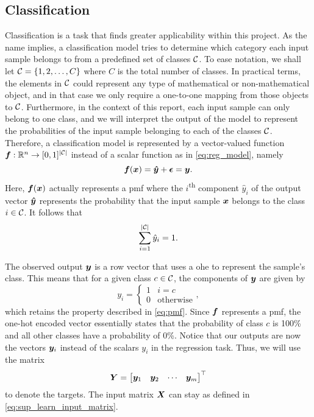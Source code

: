 \documentclass[../main.tex]{subfiles}
\begin{document}
\subsection{Classification}
Classification is a task that finds greater applicability within this project.
As the name implies, a classification model tries to determine which category each input sample belongs to from a predefined set of classes ${\mathcal{C}}$.
To ease notation, we shall let ${\mathcal{C}}=\{1, 2, \dots, C\}$ where $C$ is the total number of classes.
In practical terms, the elements in ${\mathcal{C}}$ could represent any type of mathematical or non-mathematical object, and in that case we only require a one-to-one mapping from those objects to ${\mathcal{C}}$.
Furthermore, in the context of this report, each input sample can only belong to one class, and we will interpret the output of the model to represent the probabilities of the input sample belonging to each of the classes ${\mathcal{C}}$.
Therefore, a classification model is represented by a vector-valued function
${\bm{f}} : \mathbb{R}^n \rightarrow [0,1]^{\lvert{\mathcal{C}}\rvert}$
instead of a scalar function as in \cref{eq:reg_model}, namely
\begin{equation}
    \label{eq:cla_model}
    {\bm{f}}({\bm{x}}) = {\bm{\hat{y}}} + \bm{\epsilon}= {\bm{y}}.
\end{equation}
Here, ${\bm{f}}({\bm{x}})$ actually represents a \gls{pmf} where the $i$\textsuperscript{th} component $\hat{y}_i$ of the output vector ${\bm{\hat{y}}}$ represents the probability that the input sample ${\bm{x}}$ belongs to the class $i\in {\mathcal{C}}$.
It follows that
\begin{equation}
    \label{eq:pmf}
    \sum_{i=1}^{\lvert{\mathcal{C}}\rvert} \hat{y}_i = 1.
\end{equation}

The observed output ${\bm{y}}$ is a row vector that uses a \gls{ohe} to represent the sample's class. 
This means that for a given class $c \in {\mathcal{C}}$, the components of ${\bm{y}}$ are given by
\begin{equation*}
    y_i = \begin{cases}
        1 & i=c \\
        0 & \text{otherwise}
    \end{cases},
\end{equation*}
which retains the property described in \cref{eq:pmf}.
Since ${\bm{f}}$ represents a \gls{pmf}, the one-hot encoded vector essentially states that the probability of class $c$ is 100\% and all other classes have a probability of 0\%.
Notice that our outputs are now the vectors ${\bm{y}}_i$ instead of the scalars $y_i$ in the regression task.
Thus, we will use the matrix
\begin{equation}
    {\bm{Y}} = \begin{bmatrix}
        {\bm{y}}_1 & {\bm{y}}_2 & \cdots & {\bm{y}}_m
    \end{bmatrix}^\top
\end{equation}
to denote the targets. 
The input matrix ${\bm{X}}$ can stay as defined in \cref{eq:sup_learn_input_matrix}.
\end{document}
